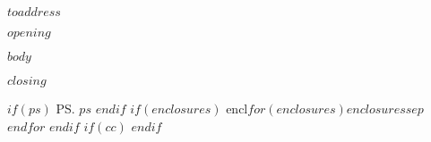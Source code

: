 \documentclass[
$if(fontsize)$
  fontsize=$fontsize$,
$endif$
$if(papersize)$
  $papersize$paper,
$endif$
  ]{scrlttr2}
\date{\today}
\begin{document}
\raggedright


\begin{letter}{$toaddress$}

\opening{$opening$}

$body$

\closing{$closing$}
$if(ps)$
\ps $ps$
$endif$
$if(enclosures)$
encl{$for(enclosures)$$enclosures$$sep$\\
$endfor$}
$endif$
$if(cc)$
$endif$

\end{letter}
\end{document}
